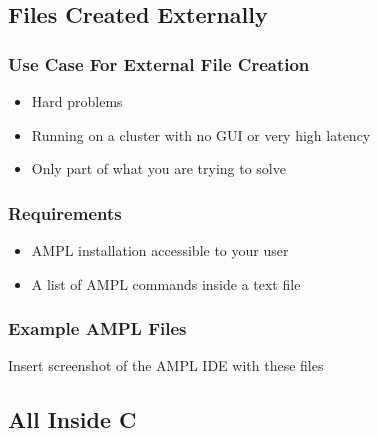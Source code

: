 \documentclass{beamer}
\begin{document}
    \subsection{Files Created Externally}
    \begin{frame}
        \frametitle{Use Case For External File Creation}
        \begin{itemize}
            \item Hard problems
            \item Running on a cluster with no GUI or very high latency
            \item Only part of what you are trying to solve
        \end{itemize}
    \end{frame}
    \begin{frame}
        \frametitle{Requirements}
        \begin{itemize}
            \item AMPL installation accessible to your user
            \item A list of AMPL commands inside a text file
        \end{itemize}
    \end{frame}
    \begin{frame}
        \frametitle{Example AMPL Files}
        Insert screenshot of the AMPL IDE with these files
    \end{frame}
    \subsection{All Inside C}
\end{document}
